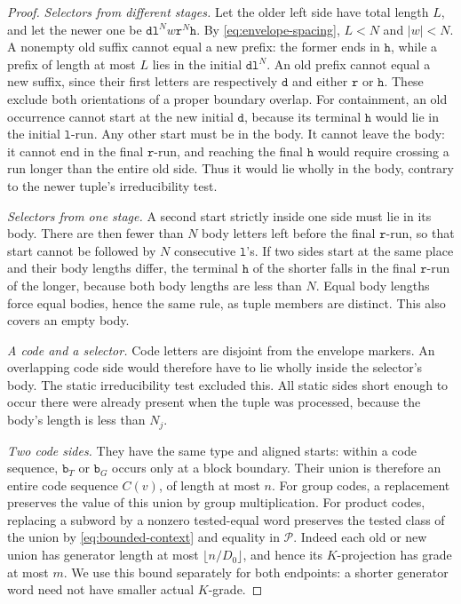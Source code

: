 \begin{proof}
\smallskip\noindent
\emph{Selectors from different stages.}
Let the older left side have total length $L$, and let the newer one
be $\mathtt d\mathtt l^N w\mathtt r^N\mathtt h$.
By \eqref{eq:envelope-spacing}, $L<N$ and $|w|<N$.
A nonempty old suffix cannot equal a new prefix: the former ends in
$\mathtt h$, while a prefix of length at most $L$ lies in the initial
$\mathtt d\mathtt l^N$.  An old prefix cannot equal a new suffix,
since their first letters are respectively $\mathtt d$ and either
$\mathtt r$ or $\mathtt h$.  These exclude both orientations of a
proper boundary overlap.  For containment, an old occurrence cannot
start at the new initial $\mathtt d$, because its terminal
$\mathtt h$ would lie in the initial $\mathtt l$-run.  Any other
start must be in the body.  It cannot leave the body: it cannot end
in the final $\mathtt r$-run, and reaching the final $\mathtt h$
would require crossing a run longer than the entire old side.
Thus it would lie wholly in the body, contrary to the newer tuple's
irreducibility test.

\smallskip\noindent
\emph{Selectors from one stage.}
A second start strictly inside one side must lie in its body.
There are then fewer than $N$ body letters left before the final
$\mathtt r$-run, so that start cannot be followed by $N$ consecutive
$\mathtt l$'s.  If two sides start at the same place and their body
lengths differ, the terminal $\mathtt h$ of the shorter falls in the
final $\mathtt r$-run of the longer, because both body lengths are
less than $N$.  Equal body lengths force equal bodies, hence the same
rule, as tuple members are distinct.  This also covers an empty body.

\smallskip\noindent
\emph{A code and a selector.}
Code letters are disjoint from the envelope markers.  An overlapping
code side would therefore have to lie wholly inside the selector's
body.  The static irreducibility test excluded this.  All static sides
short enough to occur there were already present when the tuple was
processed, because the body's length is less than $N_j$.

\smallskip\noindent
\emph{Two code sides.}
They have the same type and aligned starts: within a code sequence,
$\mathtt b_T$ or $\mathtt b_G$ occurs only at a block boundary.
Their union is therefore an entire code sequence $C(v)$, of length
at most $n$.  For group codes, a replacement preserves the value of
this union by group multiplication.  For product codes, replacing
a subword by a nonzero tested-equal word preserves the tested class
of the union by \eqref{eq:bounded-context} and equality in
$\mathcal P$.  Indeed each old or new union has generator length
at most $\lfloor n/D_0\rfloor$, and hence its $K$-projection has
grade at most $m$.  We use this bound separately for both endpoints:
a shorter generator word need not have smaller actual $K$-grade.


\end{proof}
